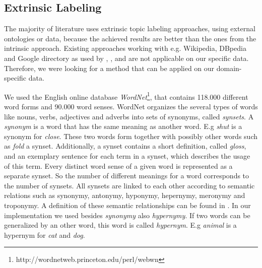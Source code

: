 \subsection{Extrinsic Labeling}
\label{sec:extrinsic}
The majority of literature uses extrinsic topic labeling approaches, using external ontologies or data, because the achieved results are better than the ones from the intrinsic approach. Existing approaches working with e.g. Wikipedia, DBpedia and Google directory as used by \textit{\cite{Lau2011}}, \textit{\cite{Hulpus2013}}, \textit{\cite{Bhatia2016}} and \textit{\cite{Magatti2009}} are not applicable on our specific data. Therefore, we were looking for a method that can be applied on our domain-specific data.

We used the English online database \textit{WordNet}\footnote{http://wordnetweb.princeton.edu/perl/webwn}, that contains 118.000 different word forms and 90.000 word senses. WordNet organizes the several types of words like nouns, verbs, adjectives and adverbs into sets of synonyms, called \textit{synsets}. A \textit{synonym} is a word that has the same meaning as another word. E.g \textit{shut} is a synonym for \textit{close}. These two words form together with possibly other words such as \textit{fold} a synset.
Additionally, a synset contains a short definition, called \textit{gloss}, and an exemplary sentence for each term in a synset, which describes the usage of this term. Every distinct word sense of a given word is represented as a separate synset. So the number of different meanings for a word corresponds to the number of synsets. All synsets are linked to each other according to semantic relations such as synonymy, antonymy, hyponymy, hepernymy, meronymy and troponymy. A definition of these semantic relationships can be found in \cite{Miller1995}. In our implementation we used besides \textit{synonymy} also \textit{hypernymy}. If two words can be generalized by an other word, this word is called \textit{hypernym}. E.g \textit{animal} is a hypernym for \textit{cat} and \textit{dog}.

